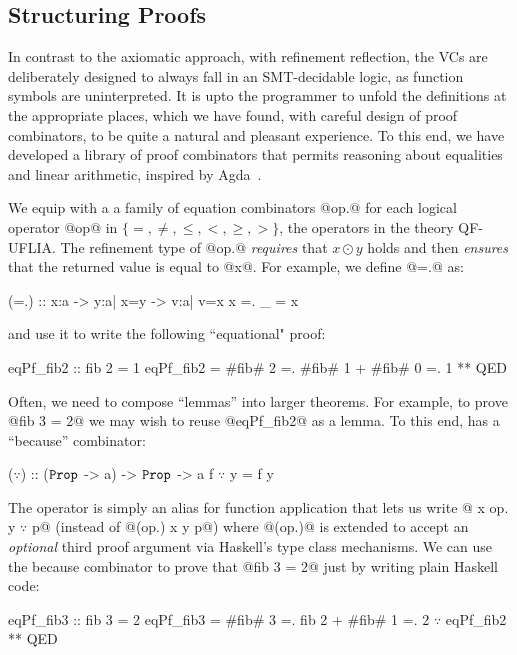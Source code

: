 \subsection{Structuring Proofs}

In contrast to the axiomatic approach,
with refinement reflection, the VCs are
deliberately designed to always fall in
an SMT-decidable logic, as function symbols
are uninterpreted.
%
It is upto the programmer to unfold the
definitions at the appropriate places,
which we have found, with careful design
of proof combinators, to be quite
a natural and pleasant experience.
%
To this end, we have developed a library
of proof combinators that permits reasoning
about equalities and linear arithmetic,
inspired by Agda~\citep{agdaequational}.

%
We equip \toolname with a a family of
equation combinators @op.@ for each
logical operator @op@ in
$\{=, \not =, \leq, <, \geq, > \}$,
the operators in the theory QF-UFLIA.
%
The refinement type of @op.@  \emph{requires}
that $x \odot y$ holds and then \emph{ensures}
that the returned value is equal to @x@.
%
For example, we define @=.@ as:
%
\begin{code}
  (=.) :: x:a -> y:{a| x=y} -> {v:a| v=x}
  x =. _ = x
\end{code}
%
and use it to write the following ``equational" proof:
%
\begin{code}
  eqPf_fib2 :: { fib 2 = 1 }
  eqPf_fib2 =  #fib# 2
            =. #fib# 1 + #fib# 0
            =. 1
            ** QED
\end{code} %

%
Often, we need to compose ``lemmas'' into larger
theorems. For example, to prove @fib 3 = 2@ we
may wish to reuse @eqPf_fib2@ as a lemma.
%
To this end, \toolname has a ``because'' combinator:
%
\begin{mcode}
  ($\because$) :: ($\texttt{Prop}$ -> a) -> $\texttt{Prop}$ -> a
  f $\because$ y = f y
\end{mcode}
%
The operator is simply an alias for function
application that lets us write
%
@ x op. y $\because$ p@ (instead of @(op.) x y p@)
where @(op.)@ is extended to accept an \textit{optional} third proof
argument via Haskell's type class mechanisms.
%
We can use the because combinator to
prove that @fib 3 = 2@ just by writing
plain Haskell code:
%
\begin{mcode}
  eqPf_fib3 :: {fib 3 = 2}
  eqPf_fib3 =  #fib# 3
            =. fib 2 + #fib# 1
            =. 2              $\because$ eqPf_fib2
            ** QED
\end{mcode}

